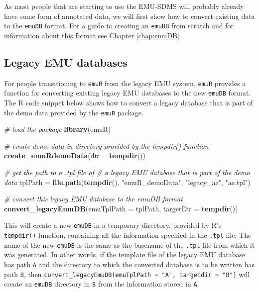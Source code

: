 \documentclass[]{book}
\newenvironment{Shaded}{\begin{snugshade}}{\end{snugshade}}
\newcommand{\CommentTok}[1]{\textcolor[rgb]{0.56,0.35,0.01}{\textit{#1}}}
\newcommand{\DataTypeTok}[1]{\textcolor[rgb]{0.13,0.29,0.53}{#1}}
\newcommand{\KeywordTok}[1]{\textcolor[rgb]{0.13,0.29,0.53}{\textbf{#1}}}
\newcommand{\NormalTok}[1]{#1}
\newcommand{\StringTok}[1]{\textcolor[rgb]{0.31,0.60,0.02}{#1}}
\begin{document}
As most people that are starting to use the EMU-SDMS will probably already have some form of annotated data, we will first show how to convert existing data to the \texttt{emuDB} format. For a guide to creating an \texttt{emuDB} from scratch and for information about this format see Chapter \ref{chap:emuDB}.

\hypertarget{legacy-emu-databases}{%
\subsection{Legacy EMU databases}\label{legacy-emu-databases}}

For people transitioning to \texttt{emuR} from the legacy EMU system, \texttt{emuR} provides a function for converting existing legacy EMU databases to the new \texttt{emuDB} format. The R code snippet below shows how to convert a legacy database that is part of the demo data provided by the \texttt{emuR} package.

\begin{Shaded}
\begin{Highlighting}[]
\CommentTok{# load the package}
\KeywordTok{library}\NormalTok{(emuR)}

\CommentTok{# create demo data in directory provided by the tempdir() function}
\KeywordTok{create_emuRdemoData}\NormalTok{(}\DataTypeTok{dir =} \KeywordTok{tempdir}\NormalTok{())}

\CommentTok{# get the path to a .tpl file of}
\CommentTok{# a legacy EMU database that is part of the demo data}
\NormalTok{tplPath =}\StringTok{ }\KeywordTok{file.path}\NormalTok{(}\KeywordTok{tempdir}\NormalTok{(),}
                    \StringTok{"emuR_demoData"}\NormalTok{,}
                    \StringTok{"legacy_ae"}\NormalTok{,}
                    \StringTok{"ae.tpl"}\NormalTok{)}

\CommentTok{# convert this legacy EMU database to the emuDB format}
\KeywordTok{convert_legacyEmuDB}\NormalTok{(}\DataTypeTok{emuTplPath =}\NormalTok{ tplPath, }\DataTypeTok{targetDir =} \KeywordTok{tempdir}\NormalTok{())}
\end{Highlighting}
\end{Shaded}

This will create a new \texttt{emuDB} in a temporary directory, provided by R's \texttt{tempdir()} function, containing all the information specified in the \texttt{.tpl} file. The name of the new \texttt{emuDB} is the same as the basename of the \texttt{.tpl} file from which it was generated. In other words, if the template file of the legacy EMU database has path \texttt{A} and the directory to which the converted database is to be written has path \texttt{B}, then \texttt{convert\_legacyEmuDB(emuTplPath\ =\ "A",\ targetdir\ =\ "B")} will create an \texttt{emuDB} directory in \texttt{B} from the information stored in \texttt{A}.
\end{document}
